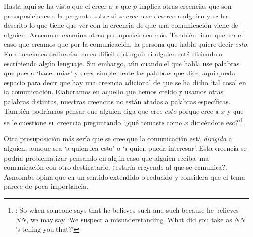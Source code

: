 Hasta aquí se ha visto que el creer a $x$ que $p$ implica otras creencias que son presuposiciones a la pregunta sobre si se cree o se descree a alguien y se ha descrito lo que tiene que ver con la creencia de que una comunicación viene de alguien. Anscombe examina otras presuposiciones más. También tiene que ser el caso que creamos que por la comunicación, la persona que habla quiere decir \emph{esto}. En situaciones ordinarias no es difícil distinguir si alguien está diciendo o escribiendo algún lenguaje. Sin embargo, aún cuando el que habla use palabras que puedo `hacer mías' y creer simplemente las palabras que dice, aquí queda espacio para decir que hay una creencia adicional de que se ha dicho `tal cosa' en la comunicación. Elaboramos en aquello que hemos creido y usamos otras palabras distintas, nuestras creencias no están atadas a palabras específicas. También podríamos pensar que alguien diga que cree \emph{esto} porque cree a $x$ y que se le cuestione su creencia preguntando `¿qué tomaste como $x$ dicicéndote eso?'\footnote{\cite[Cf.~][8]{anscombe2008faith:tobelieve}: So when someone says that he believes such-and-such because he believes $NN$, we may say `We suspect a misunderstanding. What did you take as $NN$'s telling you that?'}.

Otra presuposición más sería que se cree que la comunicación está \emph{dirigida} a alguien, aunque sea `a quien lea esto' o `a quien pueda interesar'. Esta creencia se podría problematizar pensando en algún caso que alguien reciba una comunicación con otro destinatario, ¿estaría creyendo al que se comunica?. Asncombe opina que en un sentido extendido o reducido y considera que el tema parece de poca importancia.

